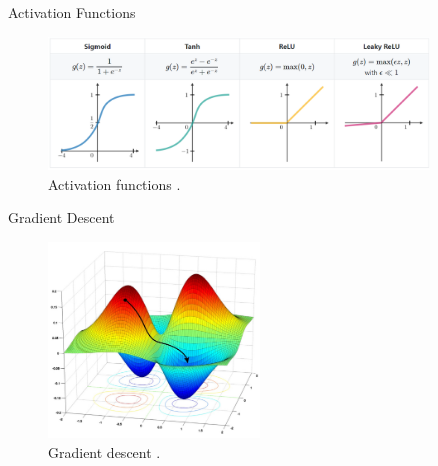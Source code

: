 \begin{frame}{Activation Functions}
    \begin{figure}[H]
		\centering
		\includegraphics[width=0.9\textwidth]{Images/activation_function_2.png}
		\caption{Activation functions \cite{activation-functions}.}
	\end{figure}
\end{frame}

\begin{frame}{Gradient Descent}
    \begin{figure}[H]
		\centering
		\includegraphics[width=0.5\textwidth]{Images/gradient_descent.jpg}
		\caption{Gradient descent \cite{gradient-descend}.}
	\end{figure}
\end{frame}





